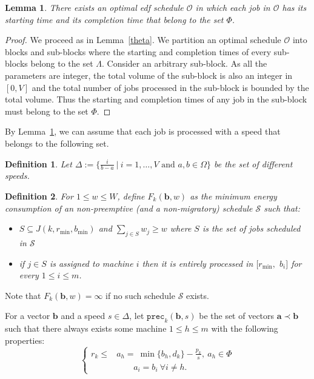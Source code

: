 \documentclass[11pt,a4paper]{article}
\newtheorem{lemma}{Lemma}
\newtheorem{definition}{Definition}
\newcommand{\vecteur}[1]{\ensuremath{\mathbf{#1}}}
\newcommand{\precedent}{\texttt{prec}}
\begin{document}
\begin{lemma}\label{Phi}
There exists an optimal {\sc edf} schedule $\mathcal{O}$ in which each job in $\mathcal{O}$
has its starting time and its completion time that belong to the set $\Phi$.
\end{lemma}
\begin{proof}
We proceed as in Lemma~\ref{theta}. We partition an optimal schedule
$\mathcal{O}$ into blocks and sub-blocks where the starting and completion times of 
every sub-blocks belong to the set $\Lambda$. Consider an arbitrary sub-block. As all the 
parameters are integer, the total volume of the sub-block is also an integer in $[0,V]$ and the 
total number of jobs processed in the sub-block is bounded by the total volume. 
Thus the starting and completion times of any job in the sub-block must belong to the set $\Phi$. 
\end{proof}

By Lemma~\ref{Phi}, we can assume that each job is processed with a speed that 
belongs to the following set.

\begin{definition}\label{def:Delta}
Let $\Delta:=\{ \frac{i}{b-a}~|~ i = 1,\ldots ,V \mbox{ and } a,b\in\Omega\}$ 
be the set of different speeds.
\end{definition}





\begin{definition}\label{def:Fktw}
For $1\leq w\leq W$, define $F_k(\vecteur{b},w)$ as the minimum energy consumption 
of an non-preemptive (and a non-migratory) schedule $\mathcal{S}$ such that:
\begin{itemize}
\item $S\subseteq J(k,r_{\min},b_{\min})$ and $\sum_{j\in S}w_j\ge w$
	where $S$ is the set of jobs scheduled in $\mathcal{S}$
\item if $j \in S$ is assigned to machine $i$ then it is entirely processed in 
	$[r_{\min},$ $b_i]$ for every $1\le i \le m$.
\end{itemize}
\end{definition}
Note that $F_k(\vecteur{b},w)= \infty$ if no such schedule $\mathcal{S}$
exists. 







For a vector $\vecteur{b}$ and a speed $s \in \Delta$,
let $\precedent_k(\vecteur{b},s)$ be the set of vectors
$\vecteur{a} \prec \vecteur{b}$ such that there always exists some machine 
$1 \leq h \leq m$ with the following properties:
\[
\left\{
\begin{aligned}
r_{k} \leq & a_h = ~ \min \{ b_{h}, d_{k} \} - \frac{p_k}{s},~a_{h} \in \Phi   \\
&\qquad a_i = b_i ~\forall i \neq h.
\end{aligned}
\right.
\]
\end{document}
